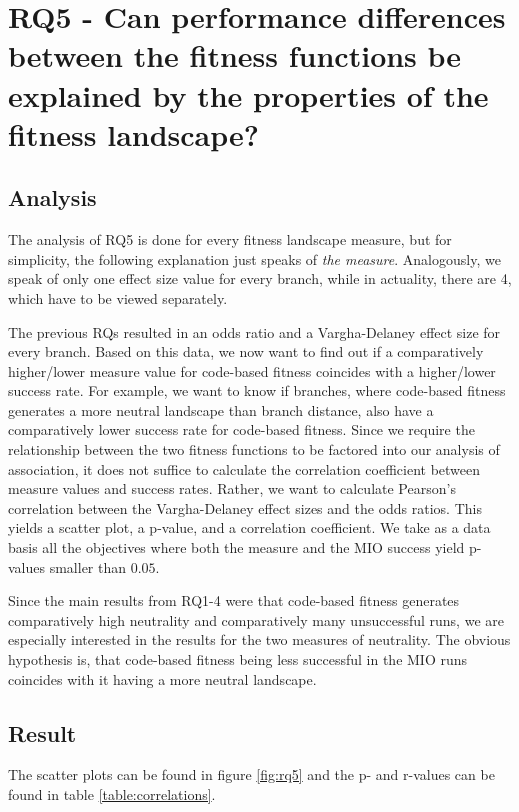 \section[RQ5]{RQ5 - Can performance differences between the fitness functions be explained by the properties of the fitness landscape?}\label{sec:rq5}

\subsection{Analysis}

The analysis of RQ5 is done for every fitness landscape measure, but for simplicity, the following explanation just speaks of \emph{the measure}. Analogously, we speak of only one effect size value for every branch, while in actuality, there are 4, which have to be viewed separately.

The previous RQs resulted in an odds ratio and a Vargha-Delaney effect size for every branch.
Based on this data, we now want to find out if a comparatively higher/lower measure value for code-based fitness coincides with a higher/lower success rate.
For example, we want to know if branches, where code-based fitness generates a more neutral landscape than branch distance, also have a comparatively lower success rate for code-based fitness.
Since we require the relationship between the two fitness functions to be factored into our analysis of association, it does not suffice to calculate the correlation coefficient between measure values and success rates.
Rather, we want to calculate Pearson's correlation between the Vargha-Delaney effect sizes and the odds ratios.
This yields a scatter plot, a p-value, and a correlation coefficient.
We take as a data basis all the objectives where both the measure and the MIO success yield p-values smaller than $0.05$.

Since the main results from RQ1-4 were that code-based fitness generates comparatively high neutrality and comparatively many unsuccessful runs, we are especially interested in the results for the two measures of neutrality.
The obvious hypothesis is, that code-based fitness being less successful in the MIO runs coincides with it having a more neutral landscape.

\subsection{Result}
The scatter plots can be found in figure \ref{fig:rq5} and the p- and r-values can be found in table \ref{table:correlations}.

